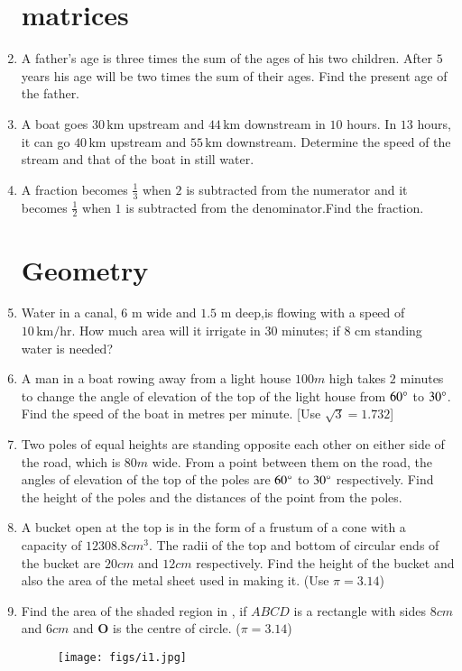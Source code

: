 \documentclass[12pt,-letter paper]{article}
\let\vec\mathbf{}
\let\vec\mathbf{}
\let\vec\mathbf{}
\begin{document}
\begin{enumerate}
\section{matrices}
\item A father's age is three times the sum of the ages of his two children. After $5$ years his age will be two times the sum of their ages. Find the present age of the father.
\item A boat goes $30 \,\text{km}$ upstream and $44 \,\text{km}$ downstream in $10$ hours. In $13$ hours, it can go $40\,\text{km}$ upstream and $55 \,\text{km}$ downstream. Determine the speed of the stream and that of the boat in still water.

\item A fraction becomes $\frac{1}{3}$ when $2$ is subtracted from the numerator and it becomes $\frac{1}{2}$ when $1$ is subtracted from the denominator.Find the fraction.




\section{Geometry}
\item Water in a canal, $6$ m wide and $1.5$ m deep,is flowing with a speed of $10 \,\text{km/hr}$. How much area will it irrigate in $30$ minutes; if $8$ cm standing water is needed?
\item A man in a boat rowing away from a light house $100m$  high takes $2$ minutes to change the angle of elevation of the top of the light house from $60\degree$ to $30\degree$. Find the speed of the boat in metres per minute. [Use $\sqrt{3}=1.732$]
\item Two poles of equal heights are standing opposite each other on either side of the road, which is $80 m$  wide. From a point between them on the road, the angles of elevation of the top of the poles are $60\degree$ to $30\degree$ respectively. Find the height of the poles and the distances of the point from the poles.
\item A bucket open at the top is in the form of a frustum of a cone with a capacity of $12308.8 cm^3$. The radii of the top and bottom of circular ends of the bucket are $20 cm$ and $12cm$ respectively. Find the height of the bucket and also the area of the metal sheet used in making it. (Use  $\pi= 3.14$)
\item Find the area of the shaded region in , if $ABCD$ is a rectangle with sides $8 cm$ and $6 cm$ and $\vec{O}$ is the centre of circle. ($\pi = 3.14$)
\begin{figure}[H]                                     \centering
	\texttt{[image: figs/i1.jpg]}
		\caption{}
		\label{fig:figure4}


\end{figure}
\end{enumerate}
\end{document}
